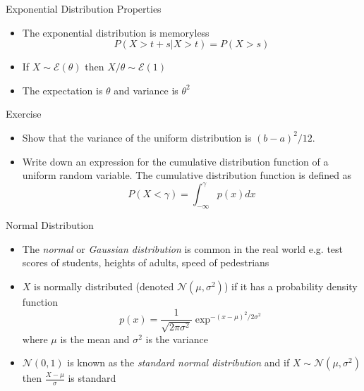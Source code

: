 \documentclass{beamer}
\begin{document}
\begin{frame}{Exponential Distribution Properties}
\begin{itemize} 
 \item The exponential distribution is memoryless 
 \begin{displaymath}
  P(X > t + s | X > t) = P(X > s)
 \end{displaymath}
\item If $X \sim \mathcal{E}(\theta)$ then $X/\theta \sim \mathcal{E}(1)$
\item The expectation is $\theta$ and variance is $\theta^2$ 
\end{itemize}
\end{frame}

\begin{frame}{Exercise} 
\begin{itemize} 
 \item Show that the variance of the uniform distribution is $(b-a)^2/12$. 
 \item Write down an expression for the cumulative distribution function of a uniform random variable. The cumulative distribution function is defined as 
\begin{displaymath} 
 P(X < \gamma) = \int_{-\infty}^\gamma p(x) dx 
\end{displaymath}
\end{itemize}
\end{frame}

\begin{frame}{Normal Distribution}  
\begin{itemize} 
 \item The \emph{normal} or \emph{Gaussian distribution} is common in the real world e.g. test scores of students, heights of adults, speed of pedestrians 
\item $X$ is normally distributed (denoted $\mathcal{N}(\mu, \sigma^2)$) if it has a probability density function 
\begin{displaymath} 
 p(x) = \frac{1}{\sqrt{2\pi\sigma^2}}\exp^{-(x-\mu)^2/2\sigma^2} 
\end{displaymath}
where $\mu$ is the mean and $\sigma^2$ is the variance
\item $\mathcal{N}(0, 1)$ is known as the \emph{standard normal distribution} and if $X \sim \mathcal{N}(\mu, \sigma^2)$ then $\frac{X-\mu}{\sigma}$ is standard 
\end{itemize}
\end{frame}
\end{document}
